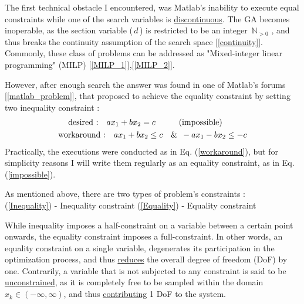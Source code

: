 \documentclass[12pt]{article}
\newcommand\tab[1][1cm]{\hspace*{#1}}
\numberwithin{equation}{section}
\begin{document}
\begin{flushleft}
The first technical obstacle I encountered, was Matlab's inability to execute equal constraints while one of the search variables is \underline{discontinuous}. The GA becomes inoperable, as the section variable (\,$d$\,) is restricted to be an integer \,$\mathbb{N}_{>0}$ , and thus breaks the continuity assumption of the search space [\ref{continuity}]. Commonly, these class of problems can be addressed as "Mixed-integer linear programming" (MILP) [\ref{MILP_1}],[\ref{MILP_2}]. 

However, after enough search the answer was found in one of Matlab's forums [\ref{matlab_problem}], that proposed to achieve the equality constraint by setting two inequality constraint :
\begin{align}
\text{desired :} \quad a x_1 + b x_2 = c \tab \text{(impossible)} \label{impossible} \hspace{10.5mm} \\
\text{workaround :} \label{workaround}
\quad a x_1 + b x_2 \leq c \quad \& \ \, - a x_1 - b x_2 \leq - c
\end{align}
Practically, the executions were conducted as in Eq. (\ref{workaround}), but for simplicity reasons I will write them regularly as an equality constraint, as in Eq. (\ref{impossible}).

As mentioned above, there are two types of problem's constraints : \\
\hspace{15mm} (\ref{Inequality}) - Inequality constraint \hspace{15mm}
(\ref{Equality}) - Equality constraint

While inequality imposes a half-constraint on a variable between a certain point onwards, the equality constraint imposes a full-constraint. In other words, an equality constraint on a single variable, degenerates its participation in the optimization process, and thus \underline{reduces} the overall degree of freedom (DoF) by one. Contrarily, a variable that is not subjected to any constraint is said to be \underline{unconstrained}, as it is completely free to be sampled within the domain \,$x_k \in (-\infty , \infty)$, and thus \underline{contributing} 1 DoF to the system.


\end{flushleft}
\end{document}
